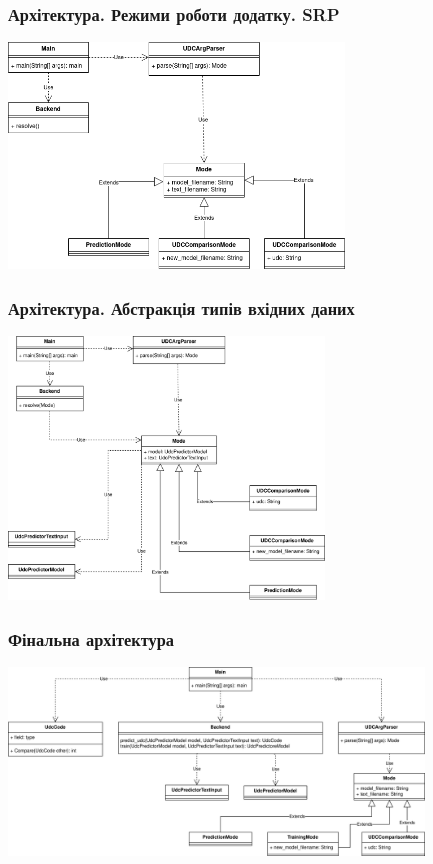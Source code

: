 \documentclass{beamer}
\begin{document}
\begin{frame}
	\frametitle{Архітектура. Режими роботи додатку. SRP}
	\begin{center}
		\includegraphics[height=6cm]{io_uml4.drawio.png}
	\end{center}
\end{frame}

\begin{frame}
	\frametitle{Архітектура. Абстракція типів вхідних даних}
	\begin{center}
		\includegraphics[height=7cm]{io_uml5.drawio.png}
	\end{center}
\end{frame}

\begin{frame}
	\frametitle{Фінальна архітектура}
	\begin{center}
		\includegraphics[height=5cm]{io_uml6.drawio.png}
	\end{center}
\end{frame}
\end{document}
